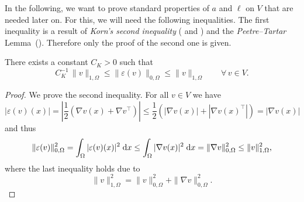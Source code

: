 In the following, we want to prove standard properties of $a$ and $\ell$ on $V$ that are needed later on. For this, we will need the following inequalities. The first inequality is a result of {\em Korn's second inequality} (\cite[Theorem 3.3]{book} and \cite[Section 3.5.2]{book}) and the {\em Peetre--Tartar} Lemma~(\cite[Lemma~3.5]{book}). Therefore only the proof of the second one is given.
\begin{lemma}\label{lem:korn}
	There exists a constant $C_K>0$ such that
	\begin{equation*}
		C_K^{-1}\,\|v\|_{1,\Omega} \le \|\varepsilon(v)\|_{0,\Omega}\le \|v\|_{1,\Omega}
		\qquad \forall\, v\in V.
	\end{equation*}
\end{lemma}
\begin{proof}
	We prove the second inequality. For all $v\in V$ we have
	\begin{equation*}
		|\varepsilon(v)(x)| = \left|\frac{1}{2}\left(\nabla v(x) +\nabla v^\top\right)\right|\le \frac{1}{2}\left(|\nabla v(x)|+|\nabla v(x)^\top|\right) = |\nabla v(x)|
	\end{equation*}
	and thus
	\begin{equation*}
		\|\varepsilon(v)\|_{0,\Omega}^2 =\int_\Omega |\varepsilon(v)(x)|^2\;{{\mathrm{d}} x} \le\int_\Omega |\nabla v(x)|^2\;{{\mathrm{d}} x} = \|\nabla v\|_{0,\Omega}^2\le \|v\|_{1,\Omega}^2,
	\end{equation*}
	where the last inequality holds due to
	\begin{equation*}
		\|v\|_{1,\Omega}^2 = \|v\|_{0,\Omega}^2 + \|\nabla v\|_{0,\Omega}^2.
	\end{equation*}
\end{proof}


